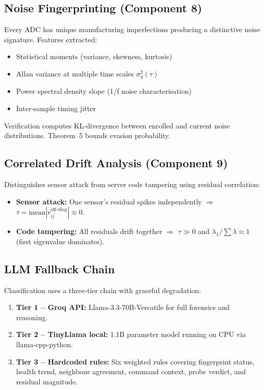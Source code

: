 \documentclass[journal]{IEEEtran}
\begin{document}
\subsection{Noise Fingerprinting (Component 8)}

Every ADC has unique manufacturing imperfections producing a distinctive noise signature. Features extracted:

\begin{itemize}[leftmargin=*]
\item Statistical moments (variance, skewness, kurtosis)
\item Allan variance at multiple time scales $\sigma^2_y(\tau)$
\item Power spectral density slope (1/f noise characterisation)
\item Inter-sample timing jitter
\end{itemize}

Verification computes KL-divergence between enrolled and current noise distributions. Theorem~5 bounds evasion probability.

\subsection{Correlated Drift Analysis (Component 9)}

Distinguishes sensor attack from server code tampering using residual correlation:

\begin{itemize}[leftmargin=*]
\item \textbf{Sensor attack:} One sensor's residual spikes independently $\Rightarrow$ $\tau = \text{mean}|r_{ij}^{\text{off-diag}}| \approx 0$.
\item \textbf{Code tampering:} All residuals drift together $\Rightarrow$ $\tau \gg 0$ and $\lambda_1/\sum\lambda \approx 1$ (first eigenvalue dominates).
\end{itemize}

\subsection{LLM Fallback Chain}

Classification uses a three-tier chain with graceful degradation:

\begin{enumerate}[leftmargin=*]
\item \textbf{Tier 1 -- Groq API:} Llama-3.3-70B-Versatile for full forensics and reasoning.
\item \textbf{Tier 2 -- TinyLlama local:} 1.1B parameter model running on CPU via llama-cpp-python.
\item \textbf{Tier 3 -- Hardcoded rules:} Six weighted rules covering fingerprint status, health trend, neighbour agreement, command context, probe verdict, and residual magnitude.
\end{enumerate}
\end{document}
